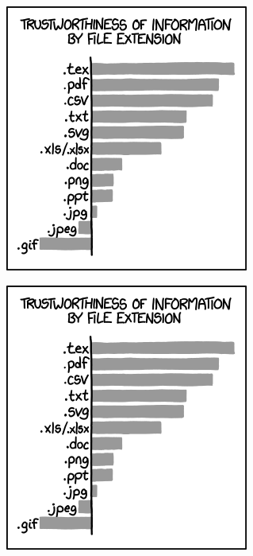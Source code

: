 \documentclass[russian]{lecture-notes}
\begin{document}
\begin{figure}[h!]
    \centering
    \begin{subfigure}[t]{70mm}
        \includegraphics[width=\textwidth]{xkcd1301.png}
        \label{fig:example-2a}
    \end{subfigure}
    \quad %
    \begin{subfigure}[t]{50mm}
        \includegraphics[width=\textwidth]{xkcd1301.png}

\end{subfigure}
\end{figure}
\end{document}
